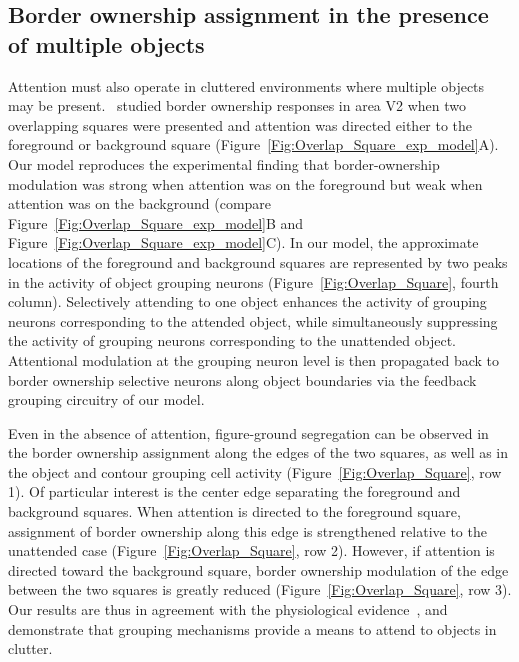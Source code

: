 {\subsection{Border ownership assignment in the presence of multiple objects}
\label{sec:BOS_overlap}
Attention must also operate in cluttered environments where multiple
objects may be present.~\cite{Qiu_etal07} studied border ownership
responses in area V2 when two overlapping squares were presented and
attention was directed either to the foreground or background square
(Figure~\ref{Fig:Overlap_Square_exp_model}A). Our model reproduces the experimental finding that  border-ownership modulation was strong when attention was on the
  foreground but weak when attention was on the background (compare Figure~\ref{Fig:Overlap_Square_exp_model}B and Figure~\ref{Fig:Overlap_Square_exp_model}C).
In our model, the approximate locations of the foreground and background squares are represented by two peaks in the activity of object grouping neurons (Figure~\ref{Fig:Overlap_Square}, fourth column). Selectively attending to one object enhances the activity of grouping neurons corresponding to the attended object, while simultaneously suppressing the activity of grouping neurons corresponding to the unattended object. Attentional modulation at the grouping neuron level is then propagated back to border ownership selective neurons along object boundaries via the feedback grouping circuitry of our model.

 Even in the absence of attention, figure-ground segregation can be observed in the border ownership
assignment along the edges of the two squares, as well as in the
object and contour grouping cell activity
(Figure~\ref{Fig:Overlap_Square}, row 1). 
Of particular interest is
the center edge separating the foreground and background squares. When
attention is directed to the foreground square, assignment of border
ownership along this edge is strengthened
relative to the unattended case
(Figure~\ref{Fig:Overlap_Square}, row 2).
 However, if attention is
directed toward the background square, border ownership modulation of
the edge between the two squares is greatly reduced
(Figure~\ref{Fig:Overlap_Square}, row 3). 
Our results are thus in agreement
with the physiological evidence~\citep{Qiu_etal07}, and demonstrate
that grouping mechanisms provide a means to attend to objects in
clutter. 

}
